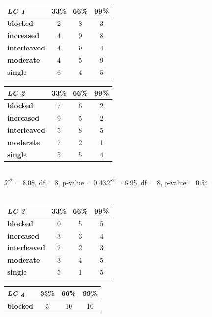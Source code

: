 \documentclass{edm_template}
\begin{document}
\begin{table}[htbp]
 \begin{center}
\begin{tabular}{|l || c | c | c |}
\hline
\emph{LC 1}&33\%&66\%&99\%\\ \hline \hline
  \textbf{blocked}&      2&  8& 3\\ \hline
\textbf{increased}&    4&  9&  8 \\ \hline
  \textbf{interleaved}&  4&  9&  4 \\ \hline
     \textbf{moderate}&     4&  5& 9 \\ \hline
       \textbf{single}&       6&  4&  5 \\ \hline
 \end{tabular}
\label{default}
\begin{tabular}{|l || c | c | c |}
\hline
\emph{LC 2}&33\%&66\%&99\%\\ \hline \hline
  \textbf{blocked}&      7&  6& 2 \\ \hline
\textbf{increased}&    9&  5&  2 \\ \hline
  \textbf{interleaved}&  5&  8&  5 \\ \hline
     \textbf{moderate}&     7&  2& 1 \\ \hline
       \textbf{single}&       5&  5&  4 \\ \hline
 \end{tabular}
\\$\mathcal{X}^2$ = 8.08, df = 8, p-value = 0.43\hspace{15pt}$\mathcal{X}^2$ = 6.95, df = 8, p-value = 0.54\\ \hspace{0pt} \\
\label{default}
\begin{tabular}{|l || c | c | c |}
\hline
\emph{LC 3}&33\%&66\%&99\%\\ \hline \hline
  \textbf{blocked}&      0&  5& 5 \\ \hline
\textbf{increased}&    3&  3&  4 \\ \hline
  \textbf{interleaved}&  2&  2&  3 \\ \hline
     \textbf{moderate}&     3&  4& 5 \\ \hline
       \textbf{single}&       5& 1&  5 \\ \hline
 \end{tabular}
\begin{tabular}{|l || c | c | c |}
\hline
\emph{LC 4}&33\%&66\%&99\%\\ \hline \hline
  \textbf{blocked}&      5&  10& 10 \\ \hline

\end{tabular}
\end{center}
\end{table}
\end{document}
